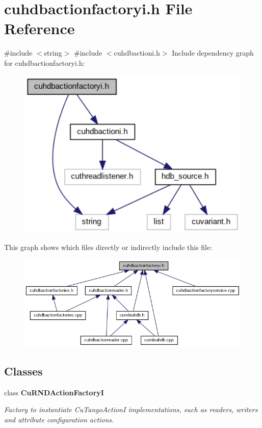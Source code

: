 \section{cuhdbactionfactoryi.\+h File Reference}
\label{cuhdbactionfactoryi_8h}
{\ttfamily \#include $<$string$>$}\newline
{\ttfamily \#include $<$cuhdbactioni.\+h$>$}\newline
Include dependency graph for cuhdbactionfactoryi.\+h\+:
\nopagebreak
\begin{figure}[H]
\begin{center}
\leavevmode
\includegraphics[width=337pt]{cuhdbactionfactoryi_8h__incl}
\end{center}
\end{figure}
This graph shows which files directly or indirectly include this file\+:
\nopagebreak
\begin{figure}[H]
\begin{center}
\leavevmode
\includegraphics[width=350pt]{cuhdbactionfactoryi_8h__dep__incl}
\end{center}
\end{figure}
\subsection*{Classes}
\begin{DoxyCompactItemize}
\item 
class \textbf{ Cu\+R\+N\+D\+Action\+FactoryI}
\begin{DoxyCompactList}\small\item\em Factory to instantiate Cu\+Tango\+ActionI implementations, such as readers, writers and attribute configuration actions. \end{DoxyCompactList}\end{DoxyCompactItemize}
